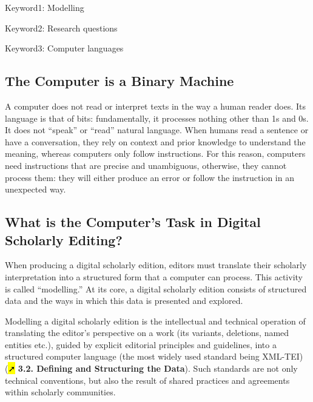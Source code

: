 \documentclass[
  letterpaper,
  DIV=11,
  numbers=noendperiod]{scrreprt}
\begin{document}
Keyword1: Modelling

Keyword2: Research questions

Keyword3: Computer languages

\subsection{The Computer is a Binary
Machine}\label{the-computer-is-a-binary-machine}

A computer does not read or interpret texts in the way a human reader
does. Its language is that of bits: fundamentally, it processes nothing
other than 1s and 0s. It does not ``speak'' or ``read'' natural
language. When humans read a sentence or have a conversation, they rely
on context and prior knowledge to understand the meaning, whereas
computers only follow instructions. For this reason, computers need
instructions that are precise and unambiguous, otherwise, they cannot
process them: they will either produce an error or follow the
instruction in an unexpected way.

\subsection{What is the Computer's Task in Digital Scholarly
Editing?}\label{what-is-the-computers-task-in-digital-scholarly-editing}

When producing a digital scholarly edition, editors must translate their
scholarly interpretation into a structured form that a computer can
process. This activity is called ``modelling.'' At its core, a digital
scholarly edition consists of structured data and the ways in which this
data is presented and explored.

Modelling a digital scholarly edition is the intellectual and technical
operation of translating the editor's perspective on a work (its
variants, deletions, named entities etc.), guided by explicit editorial
principles and guidelines, into a structured computer language (the most
widely used standard being XML-TEI) (\hl{➚} \textbf{3.2. Defining and
Structuring the Data}). Such standards are not only technical
conventions, but also the result of shared practices and agreements
within scholarly communities.
\end{document}
